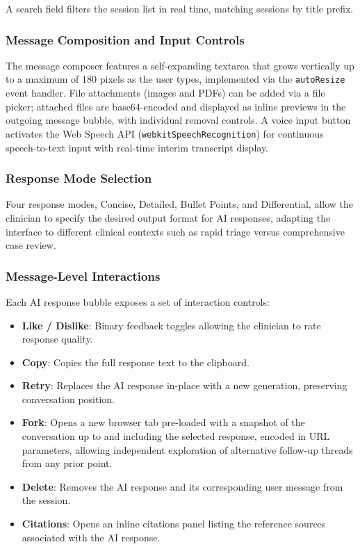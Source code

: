 A search field filters the session list in real time, matching sessions by
title prefix.

\subsubsection{Message Composition and Input Controls}

The message composer features a self-expanding textarea that grows vertically
up to a maximum of 180 pixels as the user types, implemented via the
\texttt{autoResize} event handler. File attachments (images and PDFs) can be
added via a file picker; attached files are base64-encoded and displayed as
inline previews in the outgoing message bubble, with individual removal
controls. A voice input button activates the Web Speech API
(\texttt{webkitSpeechRecognition}) for continuous speech-to-text input with
real-time interim transcript display.

\subsubsection{Response Mode Selection}

Four response modes, Concise, Detailed, Bullet Points, and Differential,
allow the clinician to specify the desired output format for AI responses,
adapting the interface to different clinical contexts such as rapid triage
versus comprehensive case review.

\subsubsection{Message-Level Interactions}

Each AI response bubble exposes a set of interaction controls:
\begin{itemize}
    \item \textbf{Like / Dislike}: Binary feedback toggles allowing the
          clinician to rate response quality.
    \item \textbf{Copy}: Copies the full response text to the clipboard.
    \item \textbf{Retry}: Replaces the AI response in-place with a new
          generation, preserving conversation position.
    \item \textbf{Fork}: Opens a new browser tab pre-loaded with a snapshot
          of the conversation up to and including the selected response,
          encoded in URL parameters, allowing independent exploration of
          alternative follow-up threads from any prior point.
    \item \textbf{Delete}: Removes the AI response and its corresponding user
          message from the session.
    \item \textbf{Citations}: Opens an inline citations panel listing the
          reference sources associated with the AI response.
\end{itemize}

